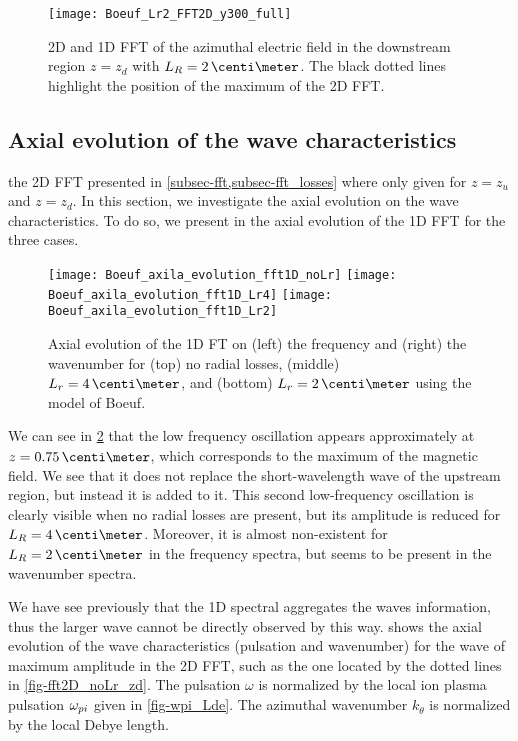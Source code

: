\begin{figure}[hbtp]
  \centering
  \texttt{[image: Boeuf\_Lr2\_FFT2D\_y300\_full]}
  \caption{\ac{2D} and \ac{1D} \ac{FFT} of the azimuthal electric field in the downstream region $z=z_d$ with $L_R=2\,\centi\meter$.  The black dotted lines highlight the position of the maximum of the \ac{2D} \ac{FFT}.}
  \label{fig-fft2D_Lr2_zd}
\end{figure}

\subsection{Axial evolution of the wave characteristics} \label{subsec-axial_profile}

the \ac{2D} \ac{FFT} presented in \cref{subsec-fft,subsec-fft_losses} where only given for $z=z_u$ and $z=z_d$.
In this section, we investigate the axial evolution on the wave characteristics.
To do so, we present in  the axial evolution of the \ac{1D} \ac{FFT} for the three cases.
 
\begin{figure}[hbtp]
  \centering
  \texttt{[image: Boeuf\_axila\_evolution\_fft1D\_noLr]}
  \texttt{[image: Boeuf\_axila\_evolution\_fft1D\_Lr4]}
  \texttt{[image: Boeuf\_axila\_evolution\_fft1D\_Lr2]}
  \caption{Axial evolution of the \ac{1D} \ac{FT} on (left) the frequency and (right) the wavenumber for (top) no radial losses, (middle) $L_r=4\,\centi\meter$, and (bottom) $L_r=2\,\centi\meter$ using the model of Boeuf. }
  \label{fig-axial_fft1D}
\end{figure}

We can see in \cref{fig-axial_fft1D} that the low frequency oscillation appears approximately at $z=0.75\,\centi\meter$, which corresponds to the maximum of the magnetic field.
We see that it does not replace the short-wavelength wave of the upstream region, but instead it is added to it.
This second low-frequency oscillation is clearly visible when no radial losses are present, but its amplitude is reduced for $L_R=4\,\centi\meter$.
Moreover, it is almost non-existent for $L_R=2\,\centi\meter$ in the frequency spectra, but seems to be present in the wavenumber spectra.

We have see previously that the \ac{1D} spectral aggregates the waves information, thus the larger wave cannot be directly observed by this way.
 shows the axial evolution of the wave characteristics (pulsation and wavenumber) for the wave of maximum amplitude in the \ac{2D} \ac{FFT}, such as the one located by the dotted lines in \cref{fig-fft2D_noLr_zd}.
The pulsation $\omega$ is normalized by the local ion plasma pulsation $\omega_{pi}$ given in \cref{fig-wpi_Lde}.
The azimuthal wavenumber $k_{\theta}$ is normalized by the local Debye length.
 
